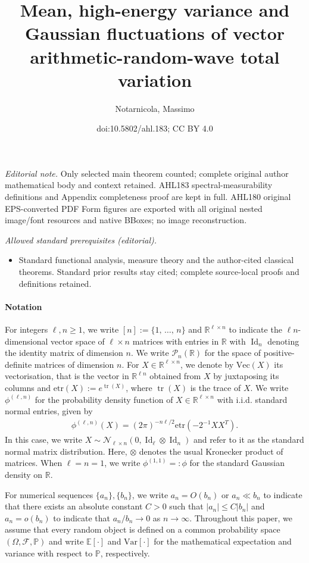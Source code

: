 \documentclass[10pt]{amsart}
\title{Mean, high-energy variance and Gaussian fluctuations of vector arithmetic-random-wave total variation}
\author{Notarnicola, Massimo}
\date{doi:10.5802/ahl.183; CC BY 4.0}
\theoremstyle{definition}\newtheorem{defi}[theo]{Definition}\newtheorem{rema}[theo]{Remark}\newtheorem{exam}[theo]{Example}\newtheorem{exem}[theo]{Example}\newtheorem{nota}[theo]{Notation}
\DeclareMathOperator{\Id}{Id}
\DeclareMathOperator{\Tr}{tr}
\newcommand{\scN}{\mathscr{N}}
\renewcommand{\Vec}{\mathrm{Vec}}
\newcommand{\clP}{\mathcal{P}}
\newcommand{\clF}{\mathcal{F}}
\newcommand{\R}{\mathbb{R}}
\newcommand{\Prob}{\mathbb{P}}
\newcommand{\E}[1]{\mathbb{E}\left[#1\right]}
\newcommand{\V}[1]{\mathrm{Var}{\left[#1\right]}}
\newcommand{\etr}[1]{\mathrm{etr}\left(#1\right)}
\begin{document}
\maketitle
\noindent\textit{Editorial note.} Only selected main theorem counted; complete original author mathematical body and context retained. AHL183 spectral-measurability definitions and Appendix completeness proof are kept in full. AHL180 original EPS-converted PDF Form figures are exported with all original nested image/font resources and native BBoxes; no image reconstruction.\par\medskip
\noindent\textit{Allowed standard prerequisites (editorial).}\begin{itemize}
\item Standard functional analysis, measure theory and the author-cited classical theorems. Standard prior results stay cited; complete source-local proofs and definitions retained.
\end{itemize}\medskip



\paragraph{Notation}
For integers $\ell,n\geq 1$, we write $[n]:=\{1,\,\ldots,\,n\}$ and $\R^{\ell \times n}$ to indicate the $\ell n$-dimensional vector space of $\ell\times n$ matrices with entries in $\R$ with $\Id_n$ denoting the identity matrix of dimension $n$. We write $\clP_{n}(\R)$ for the space of positive-definite matrices of dimension $n$. For $X \in \R^{\ell \times n}$, we denote by $\Vec(X)$ its vectorisation, that is the vector in $\R^{\ell n}$ obtained from $X$ by juxtaposing its columns and $\etr{X}:= e^{\Tr(X)}$, where $\Tr(X)$ is the trace of $X$. We write $\phi^{(\ell,n)}$ for the probability density function of $X \in \R^{\ell \times n}$ with i.i.d. standard normal entries, given by
\begin{gather*}
\phi^{(\ell,n)}(X) = (2\pi)^{-n\ell/2} \etr{-2^{-1}XX^T }.
\end{gather*}
In this case, we write $X \sim \scN_{\ell \times n}(0, \Id_{\ell}\otimes \Id_n)$ and refer to it as the standard normal matrix distribution. Here, $\otimes$ denotes the usual Kronecker product of matrices. When $\ell=n=1$, we write $\phi^{(1,1)}=:\phi$ for the standard Gaussian density on $\R$.

For numerical sequences $\{a_n\},\{b_n\}$, we write $a_n=O(b_n)$ or $a_n \ll b_n$ to indicate that there exists an absolute constant $C>0$ such that $|a_n| \leq C|b_n|$ and $a_n=o(b_n)$ to indicate that $a_n/b_n\to0$ as $n \to \infty$. Throughout this paper, we assume that every random object is defined on a common probability space $(\Omega,\clF,\Prob)$ and write $\E{\cdot}$ and $\V{\cdot}$ for the mathematical expectation and variance with respect to $\Prob$, respectively.
\end{document}

